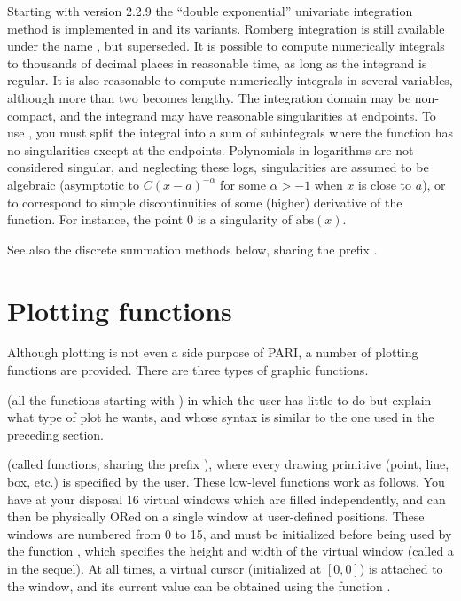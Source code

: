 Starting with version 2.2.9 the ``double exponential'' univariate
integration method is implemented in  and its variants. Romberg
integration is still available under the name , but
superseded. It is possible to compute numerically integrals to thousands of
decimal places in reasonable time, as long as the integrand is regular. It is
also reasonable to compute numerically integrals in several variables,
although more than two becomes lengthy. The integration domain may be
non-compact, and the integrand may have reasonable singularities at
endpoints. To use , you must split the integral into a sum
of subintegrals where the function has no singularities except at the
endpoints. Polynomials in logarithms are not considered singular, and
neglecting these logs, singularities are assumed to be algebraic (asymptotic
to $C(x-a)^{-\alpha}$ for some $\alpha > -1$ when $x$ is
close to $a$), or to correspond to simple discontinuities of some (higher)
derivative of the function. For instance, the point $0$ is a singularity of
$\text{abs}(x)$.

See also the discrete summation methods below, sharing the prefix .


\section{Plotting functions}

  Although plotting is not even a side purpose of PARI, a number of plotting
functions are provided. There are three types of graphic functions.

 (all the functions starting with
) in which the user has little to do but explain what type of plot
he wants, and whose syntax is similar to the one used in the preceding
section.

 (called  functions,
sharing the prefix ), where every drawing primitive (point, line,
box, etc.) is specified by the user. These low-level functions work as
follows. You have at your disposal 16 virtual windows which are filled
independently, and can then be physically ORed on a single window at
user-defined positions. These windows are numbered from 0 to 15, and must be
initialized before being used by the function , which specifies
the height and width of the virtual window (called a  in the
sequel). At all times, a virtual cursor (initialized at $[0,0]$) is attached
to the window, and its current value can be obtained using the function
.

